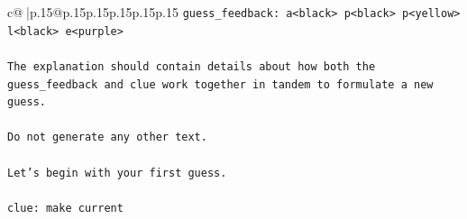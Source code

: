 \documentclass{article}
\begin{document}
{\begin{supertabular}{c@{$\;$}|p{.15\linewidth}@{}p{.15\linewidth}p{.15\linewidth}p{.15\linewidth}p{.15\linewidth}p{.15\linewidth}}
{{{\texttt{guess\_feedback: a<black> p<black> p<yellow> l<black> e<purple>} \\
\\ 
\texttt{The explanation should contain details about how both the guess\_feedback and clue work together in tandem to formulate a new guess.} \\
\\ 
\texttt{Do not generate any other text.} \\
\\ 
\texttt{Let's begin with your first guess.} \\
\\ 
\texttt{clue: make current} \\
            }
        }
    }
     \\ \\


\end{supertabular}}
\end{document}
